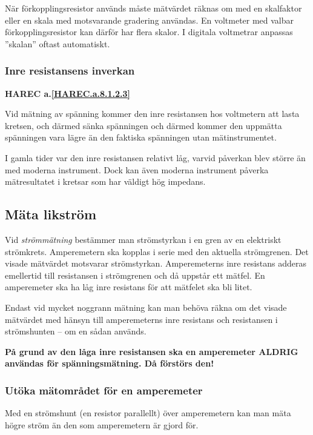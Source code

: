När förkopplingsresistor används måste mätvärdet räknas om med en
skalfaktor eller en skala med motsvarande gradering användas.
En voltmeter med valbar förkopplingsresistor kan därför har flera skalor.
I digitala voltmetrar anpassas ''skalan'' oftast automatiskt.

\subsubsection{Inre resistansens inverkan}
\textbf{
HAREC a.\ref{HAREC.a.8.1.2.3}\label{myHAREC.a.8.1.2.3}
}

Vid mätning av spänning kommer den inre resistansen hos voltmetern att lasta
kretsen, och därmed sänka spänningen och därmed kommer den uppmätta spänningen
vara lägre än den faktiska spänningen utan mätinstrumentet.

I gamla tider var den inre resistansen relativt låg, varvid påverkan blev
större än med moderna instrument.
Dock kan även moderna instrument påverka mätresultatet i kretsar som har väldigt
hög impedans.

\subsection{Mäta likström}

Vid \emph{strömmätning} bestämmer man strömstyrkan i en gren av en elektriskt
strömkrets.
Amperemetern ska kopplas i serie med den aktuella strömgrenen.
Det visade mätvärdet motsvarar strömstyrkan.
Amperemeterns inre resistans adderas emellertid till resistansen i strömgrenen
och då uppstår ett mätfel.
En amperemeter ska ha låg inre resistans för att mätfelet ska bli litet.

Endast vid mycket noggrann mätning kan man behöva räkna om det visade
mätvärdet med hänsyn till amperemeterns inre resistans och resistansen
i strömshunten -- om en sådan används.

\textbf{På grund av den låga inre resistansen ska en amperemeter
  ALDRIG användas för spänningsmätning. Då förstörs den!}

\subsubsection{Utöka mätområdet för en amperemeter}

Med en strömshunt (en resistor parallellt) över amperemetern kan man
mäta högre ström än den som amperemetern är gjord för.

